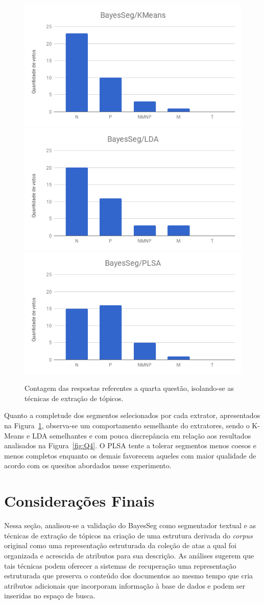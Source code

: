 \begin{figure}[!h] \centering     %

		\includegraphics[width=.31\textwidth]{conteudo/capitulos/figs/figuras-experimento/t1q4.png}
		\includegraphics[width=.31\textwidth]{conteudo/capitulos/figs/figuras-experimento/t2q4.png}
		\includegraphics[width=.31\textwidth]{conteudo/capitulos/figs/figuras-experimento/t3q4.png}

	\caption{Contagem das respostas referentes a quarta questão, isolando-se as técnicas de extração de tópicos.}
	\label{fig:influenciaExtSegQ4}
\end{figure}


Quanto a completude dos segmentos selecionados por cada extrator, apresentados na Figura~\ref{fig:influenciaExtSegQ4}, observa-se um comportamento semelhante do extratores, sendo o K-Means e LDA semelhantes e com pouca discrepância em relação aos resultados analisados na Figura~\ref{fig:Q4}. O PLSA tente a tolerar segmentos menos coesos e menos completos enquanto os demais favorecem aqueles com maior qualidade de acordo com os quesitos abordados nesse experimento.




\section{Considerações Finais}

Nessa seção, analisou-se a validação do BayesSeg como segmentador textual e as técnicas de extração de tópicos na criação de uma estrutura derivada do \textit{corpus} original como uma representação estruturada da coleção de atas a qual foi organizada e acrescida de atributos para sua descrição. As análises sugerem que tais técnicas podem oferecer a sistemas de recuperação uma representação estruturada que preserva o conteúdo dos documentos ao mesmo tempo que cria atributos adicionais que incorporam informação à base de dados e podem ser inseridas no espaço de busca.  

